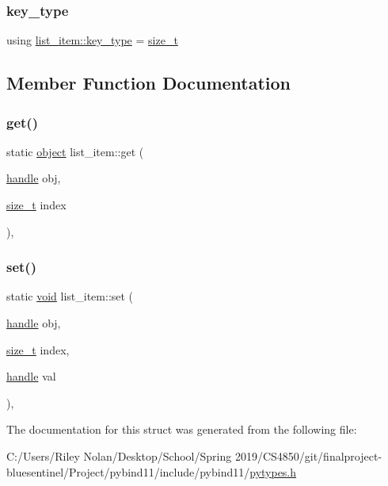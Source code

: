 \subsubsection{\texorpdfstring{key\_type}{key\_type}}
{\footnotesize\ttfamily using \mbox{\hyperlink{structlist__item_a8161f969e54abc8caaa5115ae8fdd535}{list\+\_\+item\+::key\+\_\+type}} =  \mbox{\hyperlink{detail_2common_8h_a801d6a451a01953ef8cbae6feb6a3638}{size\+\_\+t}}}



\subsection{Member Function Documentation}
\mbox{\label{structlist__item_a49b34355f8d246e5e26c14b840b74cfa}} 
\subsubsection{\texorpdfstring{get()}{get()}}
{\footnotesize\ttfamily static \mbox{\hyperlink{classobject}{object}} list\+\_\+item\+::get (\begin{DoxyParamCaption}\item[{\mbox{\hyperlink{classhandle}{handle}}}]{obj,  }\item[{\mbox{\hyperlink{detail_2common_8h_a801d6a451a01953ef8cbae6feb6a3638}{size\+\_\+t}}}]{index }\end{DoxyParamCaption})\hspace{0.3cm}{\ttfamily [inline]}, {\ttfamily [static]}}

\mbox{\label{structlist__item_a26f4e8eff2de092ab9d64b847790b7dd}} 
\subsubsection{\texorpdfstring{set()}{set()}}
{\footnotesize\ttfamily static \mbox{\hyperlink{_s_d_l__opengles2__gl2ext_8h_ae5d8fa23ad07c48bb609509eae494c95}{void}} list\+\_\+item\+::set (\begin{DoxyParamCaption}\item[{\mbox{\hyperlink{classhandle}{handle}}}]{obj,  }\item[{\mbox{\hyperlink{detail_2common_8h_a801d6a451a01953ef8cbae6feb6a3638}{size\+\_\+t}}}]{index,  }\item[{\mbox{\hyperlink{classhandle}{handle}}}]{val }\end{DoxyParamCaption})\hspace{0.3cm}{\ttfamily [inline]}, {\ttfamily [static]}}



The documentation for this struct was generated from the following file\+:\begin{DoxyCompactItemize}
\item 
C\+:/\+Users/\+Riley Nolan/\+Desktop/\+School/\+Spring 2019/\+C\+S4850/git/finalproject-\/bluesentinel/\+Project/pybind11/include/pybind11/\mbox{\hyperlink{pytypes_8h}{pytypes.\+h}}\end{DoxyCompactItemize}

